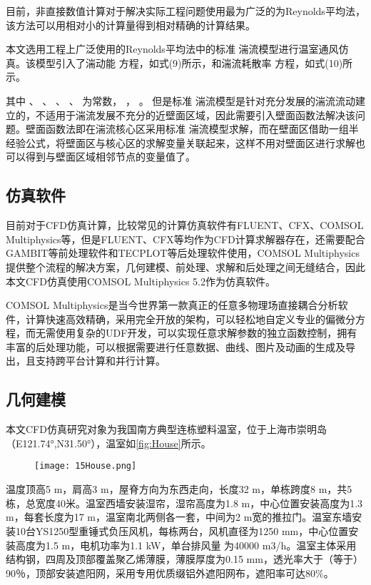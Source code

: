 目前，非直接数值计算对于解决实际工程问题使用最为广泛的为Reynolds平均法，该方法可以用相对小的计算量得到相对精确的计算结果。

本文选用工程上广泛使用的Reynolds平均法中的标准 湍流模型进行温室通风仿真。该模型引入了湍动能 方程，如式(9)所示，和湍流耗散率 方程，如式(10)所示。

其中 、 、 、 、 为常数， ， 。
但是标准 湍流模型是针对充分发展的湍流流动建立的，不适用于湍流发展不充分的近壁面区域，因此需要引入壁面函数法解决该问题。壁面函数法即在湍流核心区采用标准 湍流模型求解，而在壁面区借助一组半经验公式，将壁面区与核心区的求解变量关联起来，这样不用对壁面区进行求解也可以得到与壁面区域相邻节点的变量值了。
	\subsection{仿真软件}
	目前对于CFD仿真计算，比较常见的计算仿真软件有FLUENT、CFX、COMSOL Multiphysics等，但是FLUENT、CFX等均作为CFD计算求解器存在，还需要配合GAMBIT等前处理软件和TECPLOT等后处理软件使用，COMSOL Multiphysics提供整个流程的解决方案，几何建模、前处理、求解和后处理之间无缝结合，因此本文CFD仿真使用COMSOL Multiphysics 5.2作为仿真软件。
	
COMSOL Multiphysics是当今世界第一款真正的任意多物理场直接耦合分析软件，计算快速高效精确，采用完全开放的架构，可以轻松地自定义专业的偏微分方程，而无需使用复杂的UDF开发，可以实现任意求解参数的独立函数控制，拥有丰富的后处理功能，可以根据需要进行任意数据、曲线、图片及动画的生成及导出，且支持跨平台计算和并行计算。

	\subsection{几何建模}
本文CFD仿真研究对象为我国南方典型连栋塑料温室，位于上海市崇明岛（E121.74°,N31.50°），温室如\ref{fig:House}所示。
 	  	\begin{figure}[!htp]
  			\centering
 			\texttt{[image: 15House.png]}
		\end{figure}
温度顶高5 m，肩高3 m，屋脊方向为东西走向，长度32 m，单栋跨度8 m，共5栋，总宽度40米。温室西墙安装湿帘，湿帘高度为1.8 m，中心位置安装高度为1.3 m，每套长度为17 m，温室南北两侧各一套，中间为2 m宽的推拉门。温室东墙安装10台YS1250型重锤式负压风机，每栋两台，风机直径为1250 mm，中心位置安装高度为1.5 m，电机功率为1.1 kW，单台排风量 为40000 m3/h。温室主体采用结构钢，四周及顶部覆盖聚乙烯薄膜，薄膜厚度为0.15 mm，透光率大于（等于）90％，顶部安装遮阳网，采用专用优质缀铝外遮阳网布，遮阳率可达80\%。


